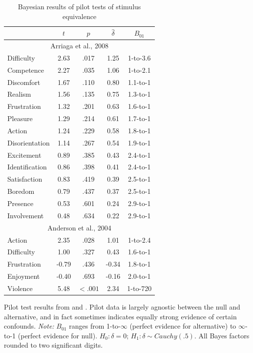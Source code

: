 \documentclass[man]{apa6}
\begin{document}
\begin{singlespace}
\begin{table}
\caption{Bayesian results of pilot tests of stimulus equivalence}
\begin{center}
\begin{tabular}{lcccc} 
&$t$&$p$&$\hat{\delta}$&$B_{01}$ \\ \hline
\multicolumn{5}{c}{Arriaga et al., 2008} \\
Difficulty&2.63&.017&1.25&1-to-3.6 \\
Competence&2.27&.035&1.06&1-to-2.1 \\
Discomfort&1.67&.110&0.80&1.1-to-1 \\ 
Realism&1.56&.135&0.75&1.3-to-1 \\
Frustration&1.32&.201&0.63&1.6-to-1 \\
Pleasure&1.29&.214&0.61&1.7-to-1 \\
Action&1.24&.229&0.58&1.8-to-1 \\
Disorientation&1.14&.267&0.54&1.9-to-1 \\ 
Excitement&0.89&.385&0.43&2.4-to-1 \\
Identification&0.86&.398&0.41&2.4-to-1 \\
Satisfaction&0.83&.419&0.39&2.5-to-1 \\ 
Boredom&0.79&.437&0.37&2.5-to-1 \\ 
Presence&0.53&.601&0.24&2.9-to-1 \\
Involvement&0.48&.634&0.22&2.9-to-1 \\
\multicolumn{5}{c}{Anderson et al., 2004}\\
Action&2.35&.028&1.01&1-to-2.4 \\
Difficulty&1.00&.327&0.43&1.6-to-1 \\
Frustration&-0.79&.436&-0.34&1.8-to-1 \\
Enjoyment&-0.40&.693&-0.16&2.0-to-1 \\
Violence&5.48&$<.001$&2.34&1-to-720 \\ \hline
\end{tabular}
\end{center}

\vspace{4mm}
Pilot test results from \citet{Arriaga:etal:2008} and \citet{Anderson:etal:2004}. Pilot data is largely agnostic between the null and alternative, and in fact sometimes indicates equally strong evidence of certain confounds. {\em Note:} $B_{01}$ ranges from 1-to-$\infty$ (perfect evidence for alternative) to $\infty$-to-1 (perfect evidence for null). $H_0: \delta = 0$; $H_1: \delta \sim Cauchy(.5)$. All Bayes factors rounded to two significant digits.
\label{ArriagaAndersonPilot}
\end{table}
\end{singlespace}
\end{document}
